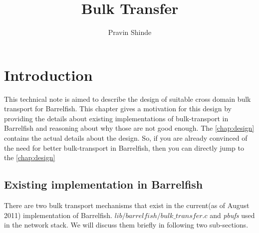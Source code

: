 \documentclass[a4paper,twoside]{report} %
\title{Bulk Transfer}   %
\author{Pravin Shinde} %
\begin{document}
\maketitle

%
%
\begin{versionhistory}
\end{versionhistory}

\tableofcontents        %

\chapter{Introduction}
\label{chap:intro}
This technical note is aimed to describe the design of suitable cross 
domain bulk transport for Barrelfish.  This chapter gives a motivation 
for this design by providing the details about existing
implementations of bulk-transport in Barrelfish and reasoning 
about why those are not good enough.  The \autoref{chap:design} 
contains the actual details about the design.  So, if you are 
already convinced of the need for better bulk-transport in 
Barrelfish, then you can directly jump to the \autoref{chap:design}


\section{Existing implementation in Barrelfish}
There are two bulk transport mechanisms that exist in the current(as of August
2011) implementation of Barrelfish.
\texttt{$lib/barrelfish/bulk\_transfer.c$}
and \textit{pbufs} used in the network stack.  We will discuss them briefly in
following two sub-sections.
\end{document}
